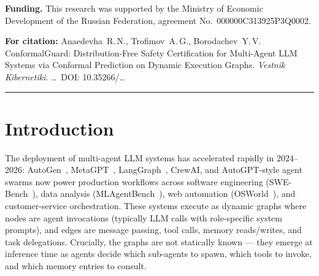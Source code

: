 \documentclass[12pt,a4paper]{article}
\theoremstyle{definition}
\theoremstyle{remark}
\newcommand{\modelname}{ConformalGuard}
\begin{document}
\vspace{0.4em}

\noindent\textbf{Funding.} This research was supported by the Ministry of Economic Development of the Russian Federation, agreement No.~000000C313925P3Q0002.

\vspace{0.4em}

\noindent\textbf{For citation:} Anaedevha~R.\,N., Trofimov~A.\,G., Borodachev~Y.\,V. \modelname{}: Distribution-Free Safety Certification for Multi-Agent LLM Systems via Conformal Prediction on Dynamic Execution Graphs. \emph{Vestnik Kibernetiki}. \ldots\ DOI: 10.35266/\ldots

\vspace{1.0em}
\hrule
\vspace{0.6em}


\section{Introduction}
\label{sec:introduction}

The deployment of multi-agent LLM systems has accelerated rapidly in 2024--2026: AutoGen~\cite{wu2023autogen}, MetaGPT~\cite{hong2024metagpt}, LangGraph~\cite{langgraph2024}, CrewAI, and AutoGPT-style agent swarms now power production workflows across software engineering (SWE-Bench~\cite{jimenez2024swebench}), data analysis (MLAgentBench~\cite{huang2024mlagentbench}), web automation (OSWorld~\cite{xie2024osworld}), and customer-service orchestration. These systems execute as dynamic graphs where nodes are agent invocations (typically LLM calls with role-specific system prompts), and edges are message passing, tool calls, memory reads/writes, and task delegations. Crucially, the graphs are not statically known --- they emerge at inference time as agents decide which sub-agents to spawn, which tools to invoke, and which memory entries to consult.
\end{document}
